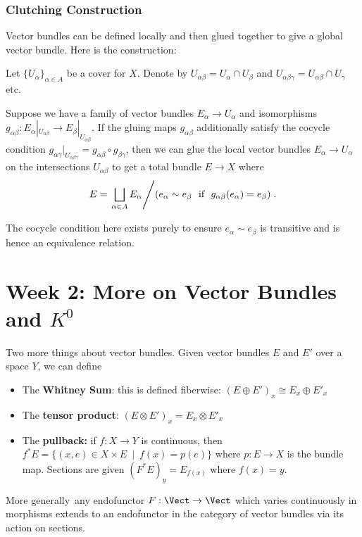 \documentclass[11pt, raggedright]{tufte-book}
\begin{document}
\subsection{Clutching Construction}
Vector bundles can be defined locally and then glued together to give a global vector bundle. Here is the construction:

\begin{thm}\label{thm:gluing-vector-bundles}
  Let $\{U_\alpha\}_{\alpha\in A}$ be a cover for $X$. Denote by $U_{\alpha\beta} = U_\alpha\cap U_\beta$ and $U_{\alpha\beta\gamma} = U_{\alpha\beta} \cap U_\gamma$ etc. 

  Suppose we have a family of vector bundles $E_\alpha \to U_\alpha$ and isomorphisms $g_{\alpha\beta}:E_\alpha|_{U_{\alpha\beta}}\to E_\beta|_{U_{\alpha\beta}}$. If the gluing maps $g_{\alpha\beta}$ additionally satisfy the cocycle condition $g_{\alpha\gamma}|_{U_{\alpha\beta\gamma}} = g_{\alpha\beta}\circ g_{\beta\gamma}$, then we can glue the local vector bundles $E_\alpha \to U_\alpha$ on the intersections $U_{\alpha\beta}$ to get a total bundle $E\to X$ where
  \begin{align*}
    E = \left.\bigsqcup_{\alpha\in A} E_\alpha \middle / (e_\alpha \sim e_\beta ~ \text{ if }~ g_{\alpha\beta}(e_\alpha) = e_\beta)\right. .
  \end{align*}
\end{thm} 

The cocycle condition here exists purely to ensure $e_\alpha \sim e_\beta$ is transitive and is hence an equivalence relation.

\chapter{Week 2: More on Vector Bundles and $K^0$}

Two more things about vector bundles. Given vector bundles $E$ and $E'$ over a space $Y$, we can define
\begin{itemize}
  \item The \textbf{Whitney Sum}: this is defined fiberwise: $(E\oplus E')_x \cong E_x \oplus E'_x$\item The \textbf{tensor product}: $(E\otimes E')_x = E_x\otimes E'_x$
  \item The \textbf{pullback:} if $f:X\to Y$ is continuous, then $f^*E = \{(x,e) \in X\times E ~\mid~ f(x) = p(e)\}$ where $p:E\to X$ is the bundle map. Sections are given $(F^*E)_y = E_{f(x)}$ where $f(x) = y$.
\end{itemize}
 More generally\, any endofunctor $F: \Vect \to \Vect$ which varies continuously in morphisms extends to an endofunctor in the category of vector bundles via its action on sections.
\end{document}
